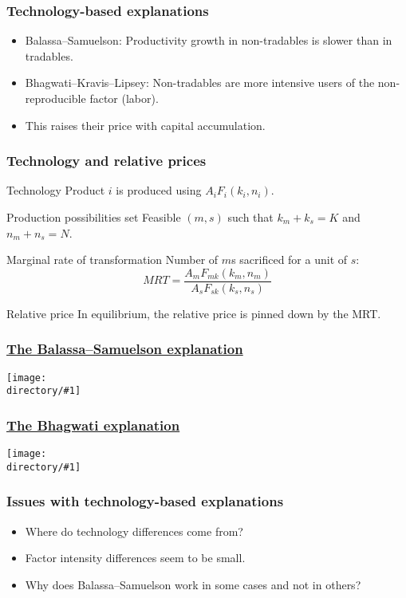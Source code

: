 \documentclass[compress,mathserif]{beamer}
\newcounter{perc}
\newcounter{percek}
\newcommand{\directory}{figures}
\newcommand{\widefigure}[2]{\begin{frame}\frametitle{\hyperlink{#1back}{#2}}\hypertarget{#1}{{\begin{center}\texttt{[image: \\directory/\#1]}\end{center}}}\end{frame}}
\renewcommand{\time}[1]{\addtocounter{percek}{#1}}
\begin{document}
\time 2

\begin{frame}\frametitle{Technology-based explanations}

\begin{itemize}
    \item Balassa--Samuelson: Productivity growth in non-tradables is slower than in tradables.
    \item Bhagwati--Kravis--Lipsey: Non-tradables are more intensive users of the non-reproducible factor (labor).
    \item This raises their price with capital accumulation.
\end{itemize}
\end{frame}

\begin{frame}\frametitle{Technology and relative prices}

\begin{block}{Technology}
Product $i$ is produced using $A_iF_i(k_i,n_i)$.
\end{block}

\begin{block}{Production possibilities set}
Feasible $(m,s)$ such that $k_m+k_s = K$ and $n_m+n_s = N$.
\end{block}

\begin{block}{Marginal rate of transformation}
Number of $m$s sacrificed for a unit of $s$: 
\[
MRT=\frac{A_mF_{mk}(k_m,n_m)}{A_sF_{sk}(k_s,n_s)}
\]
\end{block}

\begin{block}{Relative price}
In equilibrium, the relative price is pinned down by the MRT.
\end{block}

\end{frame}

\widefigure{PPF-balassa}{The Balassa--Samuelson explanation}
\widefigure{PPF-bhagwati}{The Bhagwati explanation}


\begin{frame}\frametitle{Issues with technology-based explanations}

\begin{itemize}
    \item Where do technology differences come from?
    \item Factor intensity differences seem to be small.
    \item Why does Balassa--Samuelson work in some cases and not in others?
\end{itemize}
\end{frame}
\end{document}
